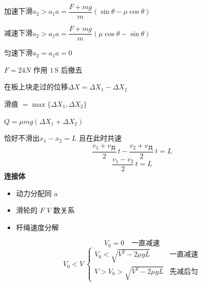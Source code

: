 \begin{problem}
\begin{solution}
加速下滑\quad $a_2>a_1$\quad $a=\dfrac{F+mg}{m}(\sin\theta-\mu\cos\theta)$ %

减速下滑\quad $a_2>a_1$\quad $a=\dfrac{F+mg}{m}(\mu\cos\theta-\sin\theta)$

匀速下滑\quad $a_2=a_1$\quad $a=0$
\end{solution}
\end{problem}
\begin{problem}
$F=24\unit{N}$ 作用 $1\,\mathrm{S}$ 后撤去
\begin{solution}
在板上块走过的位移\quad $\Delta X=\Delta X_1-\Delta X_2$

滑痕 $=\max\{\Delta X_1,\Delta X_2\}$

$Q=\mu mg(\Delta X_1+\Delta X_2)$
\end{solution}
\end{problem}
恰好不滑出\quad $x_1-x_2=L$ 且在此时共速
\[
\frac{v_1+v_{\text{共}}}{2}\,t-\frac{v_2+v_{\text{共}}}{2}\,t=L
\]
\[
\frac{v_1-v_2}{2}\,t=L
\]
\textbf{连接体}
\begin{itemize}
\item 动力分配\quad 同 $a$
\item 滑轮的 $F$ $V$ 数关系 %
\item 杆绳\quad 速度分解
\end{itemize}
\[
V_0=0\quad\text{一直减速}
\]
\[
V_0<V\ \left\{\begin{array}{ll}
V_0<\sqrt{V^2-2\mu gL} & \text{一直减速}\\
V>V_0>\sqrt{V^2-2\mu gL} & \text{先减后匀}
\end{array}\right.
\]
